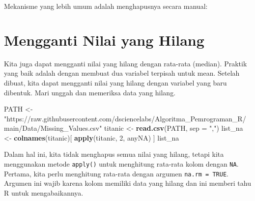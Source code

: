 \documentclass[
]{book}
\newenvironment{Shaded}{\begin{snugshade}}{\end{snugshade}}
\newcommand{\AttributeTok}[1]{\textcolor[rgb]{0.13,0.29,0.53}{#1}}
\newcommand{\CommentTok}[1]{\textcolor[rgb]{0.56,0.35,0.01}{\textit{#1}}}
\newcommand{\DecValTok}[1]{\textcolor[rgb]{0.00,0.00,0.81}{#1}}
\newcommand{\FunctionTok}[1]{\textcolor[rgb]{0.13,0.29,0.53}{\textbf{#1}}}
\newcommand{\NormalTok}[1]{#1}
\newcommand{\OtherTok}[1]{\textcolor[rgb]{0.56,0.35,0.01}{#1}}
\newcommand{\SpecialCharTok}[1]{\textcolor[rgb]{0.81,0.36,0.00}{\textbf{#1}}}
\newcommand{\StringTok}[1]{\textcolor[rgb]{0.31,0.60,0.02}{#1}}
\begin{document}
Mekanisme yang lebih umum adalah menghapusnya secara manual:

\begin{Shaded}
\end{Shaded}

\hypertarget{mengganti-nilai-yang-hilang}{%
\section{Mengganti Nilai yang Hilang}\label{mengganti-nilai-yang-hilang}}

Kita juga dapat mengganti nilai yang hilang dengan rata-rata (median). Praktik yang baik adalah dengan membuat dua variabel terpisah untuk mean. Setelah dibuat, kita dapat mengganti nilai yang hilang dengan variabel yang baru dibentuk. Mari unggah dan memeriksa data yang hilang.

\begin{Shaded}
\begin{Highlighting}[]
\NormalTok{PATH }\OtherTok{\textless{}{-}} \StringTok{"https://raw.githubusercontent.com/dsciencelabs/Algoritma\_Pemrograman\_R/main/Data/Missing\_Values.csv"}
\NormalTok{titanic }\OtherTok{\textless{}{-}} \FunctionTok{read.csv}\NormalTok{(PATH, }\AttributeTok{sep =} \StringTok{","}\NormalTok{)}
\NormalTok{list\_na }\OtherTok{\textless{}{-}} \FunctionTok{colnames}\NormalTok{(titanic)[ }\FunctionTok{apply}\NormalTok{(titanic, }\DecValTok{2}\NormalTok{, anyNA) ]}
\NormalTok{list\_na}
\end{Highlighting}
\end{Shaded}

Dalam hal ini, kita tidak menghapus semua nilai yang hilang, tetapi kita menggunakan metode \texttt{apply()} untuk menghitung rata-rata kolom dengan \texttt{NA}. Pertama, kita perlu menghitung rata-rata dengan argumen \texttt{na.rm\ =\ TRUE}. Argumen ini wajib karena kolom memiliki data yang hilang dan ini memberi tahu R untuk mengabaikannya.
\end{document}
